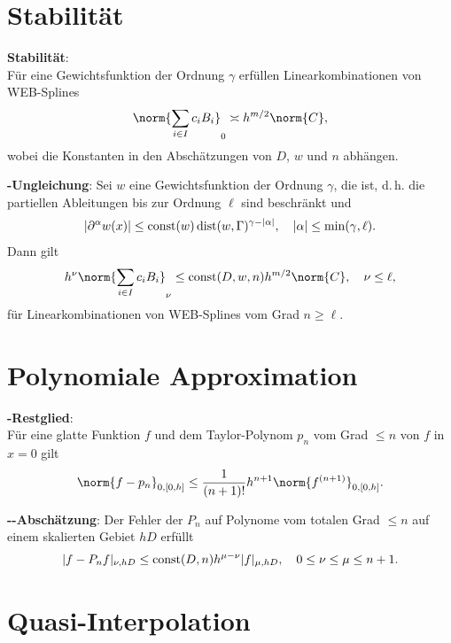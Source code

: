 \section{%
    Stabilität%
}

\textbf{Stabilität}:\\
Für eine Gewichtsfunktion der Ordnung $\gamma$ erfüllen Linearkombinationen von WEB-Splines
\begin{align*}
    \norm{\sum_{i \in I} c_i B_i}_0 \asymp h^{m/2} \norm{C},
\end{align*}
wobei die Konstanten in den Abschätzungen von $D$, $w$ und $n$ abhängen.

\textbf{-Ungleichung}:
Sei $w$ eine Gewichtsfunktion der Ordnung $\gamma$, die  ist,
d.\,h. die partiellen Ableitungen bis zur Ordnung $\ell$ sind beschränkt und
\begin{align*}
    |\partial^\alpha w(x)| \le \operatorname{const}(w) \operatorname{dist}(w, \Gamma)^{\gamma-|\alpha|},\quad
    |\alpha| \le \min(\gamma, \ell).
\end{align*}
Dann gilt
\begin{align*}
    h^\nu \norm{\sum_{i \in I} c_i B_i}_\nu
    \le \const(D, w, n) h^{m/2} \norm{C},\quad
    \nu \le \ell,
\end{align*}
für Linearkombinationen von WEB-Splines vom Grad $n \ge \ell$.

\section{%
    Polynomiale Approximation%
}

\textbf{-Restglied}:\\
Für eine glatte Funktion $f$ und dem Taylor-Polynom $p_n$ vom Grad $\le n$
von $f$ in $x = 0$ gilt
\begin{align*}
    \norm{f - p_n}_{0,[0,h]}
    \le \frac{1}{(n+1)!} h^{n+1} \norm{f^{(n+1)}}_{0,[0,h]}.
\end{align*}

\textbf{--Abschätzung}:
Der Fehler der  $P_n$ auf Polynome vom totalen Grad $\le n$
auf einem skalierten Gebiet $hD$ erfüllt
\begin{align*}
    |f - P_n f|_{\nu,hD}
    \le \operatorname{const}(D, n) h^{\mu-\nu} |f|_{\mu,hD},\quad
    0 \le \nu \le \mu \le n + 1.
\end{align*}

\section{%
    Quasi-Interpolation%
}

